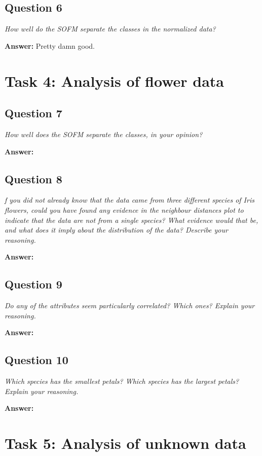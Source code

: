 \documentclass[a4paper]{article}
\begin{document}
\subsection*{Question 6}
\emph{How well do the SOFM separate the classes in the normalized
data?}

\textbf{Answer:} 
Pretty damn good.

\section*{Task 4: Analysis of flower data}

\subsection*{Question 7}
\emph{How well does the SOFM separate the classes, in your opinion?}

\textbf{Answer: } 

\subsection*{Question 8}
\emph{f you did not already know that the data came from three different species of Iris flowers, could you have found any evidence in the neighbour distances plot to indicate that the data are not from a single species? What evidence would that be, and what does it imply about the distribution of the data?
Describe your reasoning.}

\textbf{Answer:} 

\subsection*{Question 9}
\emph{Do any of the attributes seem particularly correlated? Which
ones? Explain your reasoning.}

\textbf{Answer:} 

\subsection*{Question 10}
\emph{Which species has the smallest petals? Which species has the
largest petals? Explain your reasoning.}

\textbf{Answer:} 

\section*{Task 5: Analysis of unknown data}
\end{document}
